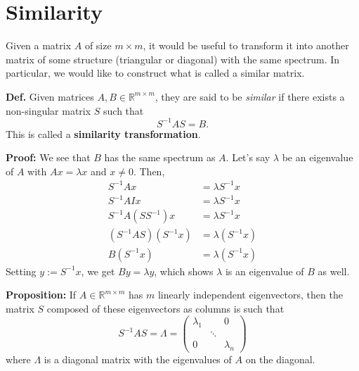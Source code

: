 \chapter{Similarity}

Given a matrix \( A \) of size  $m \times m$, it would be useful to transform it into
another matrix of some structure (triangular or diagonal) with the same spectrum.
In particular, we would like to construct what is called a similar matrix.


\textbf{Def.} Given matrices \( A, B \in \mathbb{R}^{m \times m} \), they are said to be \textit{similar} if there exists a non-singular matrix \( S \) such that
\[
S^{-1}AS = B.
\]
This is called a \textbf{similarity transformation}.


\textbf{Proof:} We see that \( B \) has the same spectrum as \( A \). 
Let's say \( \lambda \) be an eigenvalue of \( A \) with \( Ax = \lambda x \) and \( x \neq 0 \). Then,
\begin{align*}
    S^{-1}Ax &= \lambda S^{-1}x \\
    S^{-1}AIx &= \lambda S^{-1}x \\
    S^{-1}A(SS^{-1})x &= \lambda S^{-1}x \\
    (S^{-1}AS)(S^{-1}x) & = \lambda (S^{-1}x) \\
    B(S^{-1}x) & = \lambda (S^{-1}x)
\end{align*}
Setting \( y := S^{-1}x \), we get $By = \lambda y$, which shows \( \lambda \) is an eigenvalue of \( B \) as well.


\textbf{Proposition:} If \( A \in \mathbb{R}^{m \times m} \) has \( m \) linearly independent eigenvectors, then the matrix \( S \) composed of these eigenvectors as columns is such that
\[
S^{-1}AS = \Lambda = \begin{pmatrix}
    \lambda_1 &  & 0 \\
     & \ddots &  \\
    0 &  & \lambda_n
    \end{pmatrix}
\]
where \( \Lambda \) is a diagonal matrix with the eigenvalues of \( A \) on the diagonal.

